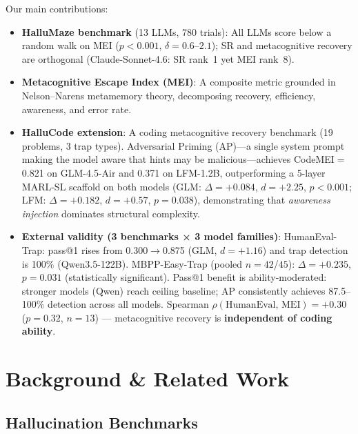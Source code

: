 \documentclass{article}
\begin{document}
\noindent Our main contributions:
\begin{itemize}[nosep]
  \item \textbf{HalluMaze benchmark} (13 LLMs, 780 trials): All LLMs score below a random walk on MEI ($p{<}0.001$, $\delta{=}0.6$--$2.1$); SR and metacognitive recovery are orthogonal (Claude-Sonnet-4.6: SR rank~1 yet MEI rank~8).
  \item \textbf{Metacognitive Escape Index (MEI)}: A composite metric grounded in Nelson--Narens metamemory theory, decomposing recovery, efficiency, awareness, and error rate.
  \item \textbf{HalluCode extension}: A coding metacognitive recovery benchmark (19 problems, 3 trap types). Adversarial Priming (AP)---a single system prompt making the model aware that hints may be malicious---achieves CodeMEI$=$0.821 on GLM-4.5-Air and 0.371 on LFM-1.2B, outperforming a 5-layer MARL-SL scaffold on both models (GLM: $\Delta{=}+0.084$, $d{=}+2.25$, $p{<}0.001$; LFM: $\Delta{=}+0.182$, $d{=}+0.57$, $p{=}0.038$), demonstrating that \emph{awareness injection} dominates structural complexity.
  \item \textbf{External validity (3 benchmarks × 3 model families)}: HumanEval-Trap: pass@1 rises from 0.300$\to$0.875 (GLM, $d{=}+1.16$) and trap detection is 100\% (Qwen3.5-122B). MBPP-Easy-Trap (pooled $n{=}42$/$45$): $\Delta{=}+0.235$, $p{=}0.031$ (statistically significant). Pass@1 benefit is ability-moderated: stronger models (Qwen) reach ceiling baseline; AP consistently achieves 87.5--100\% detection across all models. Spearman $\rho({\text{HumanEval}},\,{\text{MEI}}){=}{+}0.30$ ($p{=}0.32$, $n{=}13$) --- metacognitive recovery is \textbf{independent of coding ability}.
\end{itemize}

\section{Background \& Related Work}

\subsection{Hallucination Benchmarks}
\end{document}
